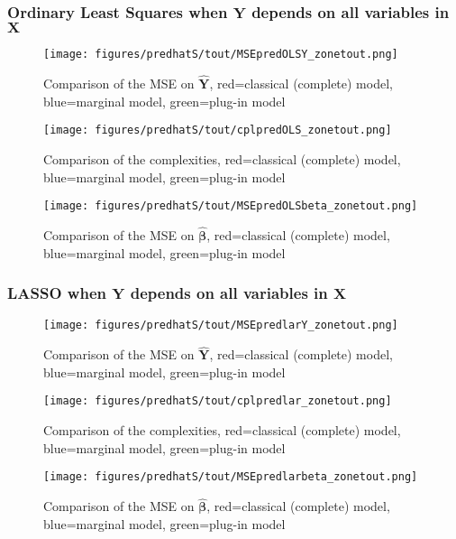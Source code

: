 \documentclass[12pt,a4paper]{report}
\begin{document}
\FloatBarrier

\newpage
\subsubsection{Ordinary Least Squares when $\boldsymbol{Y}$ depends on all variables in $\boldsymbol{X}$}
	\begin{figure}[h!]
	\centering
		  \texttt{[image: figures/predhatS/tout/MSEpredOLSY\_zonetout.png]}
		\caption{Comparison of the MSE on $\hat{\boldsymbol{Y}}$, red=classical (complete) model, blue=marginal model, green=plug-in model}\label{MSEpredOLSY_zonetout}
	\end{figure}
	\begin{figure}[h!]
	\centering
		  \texttt{[image: figures/predhatS/tout/cplpredOLS\_zonetout.png]}
		\caption{Comparison of the complexities, red=classical (complete) model, blue=marginal model, green=plug-in model}\label{cplpredOLS_zonetout}
	\end{figure}
	\begin{figure}[h!]
	\centering
		  \texttt{[image: figures/predhatS/tout/MSEpredOLSbeta\_zonetout.png]}
		\caption{Comparison of the MSE on $\hat{\boldsymbol{\beta}}$, red=classical (complete) model, blue=marginal model, green=plug-in model}\label{MSEpredOLSbeta_zonetout}
	\end{figure}
	\FloatBarrier
	
\newpage
\subsubsection{LASSO when $\boldsymbol{Y}$ depends on all variables in $\boldsymbol{X}$}

	\begin{figure}[h!]
	\centering
		  \texttt{[image: figures/predhatS/tout/MSEpredlarY\_zonetout.png]}
		\caption{Comparison of the MSE on $\hat{\boldsymbol{Y}}$, red=classical (complete) model, blue=marginal model, green=plug-in model}\label{MSEpredlarY_zonetout}
	\end{figure}
	\begin{figure}[h!]
	\centering
		  \texttt{[image: figures/predhatS/tout/cplpredlar\_zonetout.png]}
		\caption{Comparison of the complexities, red=classical (complete) model, blue=marginal model, green=plug-in model}\label{cplpredlar_zonetout}
	\end{figure}
	\begin{figure}[h!]
	\centering
		  \texttt{[image: figures/predhatS/tout/MSEpredlarbeta\_zonetout.png]}
		\caption{Comparison of the MSE on $\hat{\boldsymbol{\beta}}$, red=classical (complete) model, blue=marginal model, green=plug-in model}\label{MSEpredlarbeta_zonetout}
	\end{figure}
	\FloatBarrier
\newpage
\end{document}
